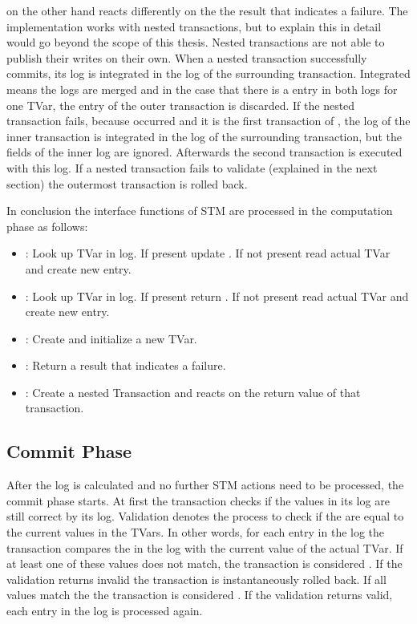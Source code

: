  on the other hand reacts differently on the the result that indicates a failure. The implementation works with nested transactions, 
but to explain this in detail would go beyond the scope of this thesis. Nested transactions are not able to publish their writes on their own.
When a nested transaction successfully commits, its log is integrated in the log of the surrounding transaction. 
Integrated means the logs are merged and in the case that there is a entry in both logs for one TVar, the entry of the outer transaction is discarded.
If the nested transaction fails, because  occurred and it is the first transaction of , the log of the inner transaction
is integrated in the log of the surrounding transaction, but the  fields of the inner log are ignored. Afterwards the second
transaction is executed with this log. If a nested transaction
fails to validate (explained in the next section) the outermost transaction is rolled back.

In conclusion the interface functions of STM are processed in the computation phase as follows:
\begin{itemize}
 \item {}: Look up TVar in log. If present update . If not present read actual TVar and create new entry.
 \item {}: Look up TVar in log. If present return . If not present read actual TVar and create new entry.
 \item {}: Create and initialize a new TVar. 
 \item {}: Return a result that indicates a failure.
 \item {}: Create a nested Transaction and reacts on the return value of that transaction.
\end{itemize}

\subsection{Commit Phase}
\label{Sec:STMImplCommit}
After the log is calculated and no further STM actions need to be processed, the commit phase starts.
At first the transaction checks if the values in its log are still correct by  its log.
Validation denotes the process to check if the  are equal to the current values in the TVars.
In other words, for each entry in the log the transaction compares the  in the log with the 
current value of the actual TVar. If at least one of these values does not match, the transaction is considered
. If the validation returns invalid the transaction is instantaneously rolled back.
If all values match the the transaction is considered . If the validation
returns valid, each entry in the log is processed again. 

